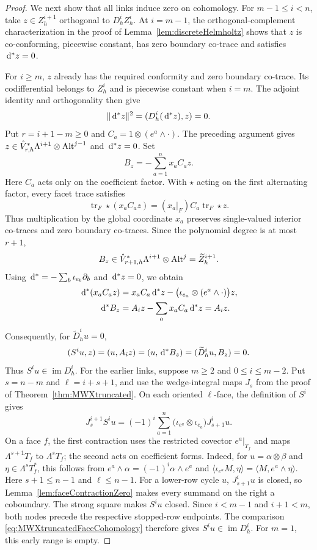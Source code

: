 \documentclass[10pt]{amsart}
\numberwithin{equation}{section}
\newcommand{\dd}{\,{\rm d}}
\newcommand{\tr}{\operatorname{tr}}
\begin{document}
\begin{proof}
We next show that all links induce zero on cohomology.
For $m-1\leq i<n$, take $z\in Z_h^{i+1}$ orthogonal to $D_h^iZ_h^i$.
At $i=m-1$, the orthogonal-complement characterization in the proof of
Lemma~\ref{lem:discreteHelmholtz} shows that $z$ is co-conforming, piecewise constant, has zero
boundary co-trace and satisfies $\dd^*z=0$.

For $i\geq m$, $z$ already has the required conformity and zero boundary
co-trace. Its codifferential belongs to $Z_h^i$ and is piecewise constant
when $i=m$. The adjoint identity and orthogonality then give
\[
\|\dd^*z\|^2=(D_h^i(\dd^*z),z)=0.
\]
Put $r=i+1-m\geq0$ and $C_a=1\otimes(e^a\wedge\cdot)$.
The preceding argument gives
$z\in\mathring V_{r,h}^{*}\Lambda^{i+1}\otimes{\rm Alt}^{j-1}$
and $\dd^*z=0$. Set
\[
B_z=-\sum_{a=1}^n x_aC_a z.
\]
Here $C_a$ acts only on the coefficient factor. With $\star$ acting on
the first alternating factor, every facet trace satisfies
\[
\tr_F\star(x_aC_a z)=(x_a|_F)C_a\tr_F\star z.
\]
Thus multiplication by the global coordinate $x_a$ preserves single-valued
interior co-traces and zero boundary co-traces. Since the polynomial
degree is at most $r+1$,
\[
B_z\in\mathring V_{r+1,h}^{*}\Lambda^{i+1}\otimes{\rm Alt}^{j}
=\widetilde Z_h^{i+1}.
\]
Using $\dd^*=-\sum_b\iota_{e_b}\partial_b$ and $\dd^*z=0$, we obtain
\begin{align*}
\dd^*(x_aC_a z)
&=x_aC_a\dd^*z-\bigl(\iota_{e_a}\otimes(e^a\wedge\cdot)\bigr)z,\\*
\dd^*B_z&=A_i z-\sum_a x_aC_a\dd^*z=A_i z.
\end{align*}
Consequently, for $\widetilde D_h^iu=0$,
\[
(S^iu,z)=(u,A_i z)=(u,\dd^*B_z)
=(\widetilde D_h^iu,B_z)=0.
\]
Thus $S^iu\in\operatorname{im}D_h^i$.
For the earlier links, suppose $m\geq2$ and $0\leq i\leq m-2$.
Put $s=n-m$ and $\ell=i+s+1$, and use the wedge-integral maps
$J_s$ from the proof of Theorem~\ref{thm:MWXtruncated}.
On each oriented $\ell$-face, the definition of $S^i$ gives
\begin{equation}\label{eq:lowerBGGfaceFactorization}
J_s^{i+1}S^iu=(-1)^i\sum_{a=1}^n
\bigl(\iota_{e^a}\otimes\iota_{e_a}\bigr)J_{s+1}^iu.
\end{equation}
On a face $f$, the first contraction uses the restricted covector
$e^a|_{T_f}$ and maps $\Lambda^{s+1}T_f$ to $\Lambda^sT_f$;
the second acts on coefficient forms. Indeed, for $u=\alpha\otimes\beta$ and
$\eta\in\Lambda^sT_f^*$, this follows from
$e^a\wedge\alpha=(-1)^i\alpha\wedge e^a$ and
$\langle\iota_{e^a}M,\eta\rangle
=\langle M,e^a\wedge\eta\rangle$.
Here $s+1\leq n-1$ and $\ell\leq n-1$.
For a lower-row cycle $u$, $J_{s+1}^iu$ is closed, so
Lemma~\ref{lem:faceContractionZero} makes every summand on the right
a coboundary. The strong square makes $S^iu$ closed.
Since $i<m-1$ and $i+1<m$, both nodes precede the respective
stopped-row endpoints. The comparison
\eqref{eq:MWXtruncatedFaceCohomology} therefore gives
$S^iu\in\operatorname{im}D_h^i$.
For $m=1$, this early range is empty.



\end{proof}
\end{document}
